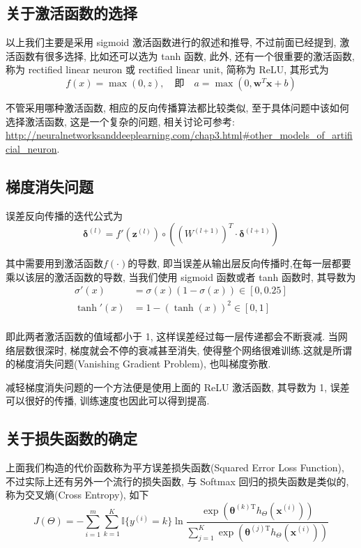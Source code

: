 \documentclass[a4paper,UTF8]{ctexart}
\theoremstyle{plain} \newtheorem{theorem}{定理}[section]
\theoremstyle{plain} \newtheorem{definition}{定义}[section]
\theoremstyle{plain} \newtheorem{lemma}{引理}[section]
\theoremstyle{plain} \newtheorem{proposition}{命题}[section]
\theoremstyle{plain} \newtheorem{example}{例}[section]
\theoremstyle{plain} \newtheorem{remark}{注}[section]
\theoremstyle{plain} \newtheorem{corollary}{推论}[section]
\begin{document}
\subsection{关于激活函数的选择}
以上我们主要是采用 sigmoid 激活函数进行的叙述和推导, 不过前面已经提到, 激活函数有很多选择, 比如还可以选为 tanh 函数, 此外, 还有一个很重要的激活函数, 称为 rectified linear neuron 或 rectified linear unit, 简称为 ReLU, 其形式为
\begin{equation*}
f(x) = \max (0, z), \quad \textrm{即} \quad a = \max(0, \bm{w}^{T} \bm{x} + b)
\end{equation*}

不管采用哪种激活函数, 相应的反向传播算法都比较类似, 至于具体问题中该如何选择激活函数, 这是一个复杂的问题, 相关讨论可参考: \url{http://neuralnetworksanddeeplearning.com/chap3.html#other_models_of_artificial_neuron}.


\subsection{梯度消失问题}
误差反向传播的迭代公式为
\begin{equation*}
\bm{\delta}^{(l)} = f'(\bm{z}^{(l)}) \circ \left( (W^{(l+1)})^{T} \cdot \bm{\delta}^{(l+1)} \right)
\end{equation*}

其中需要用到激活函数$f(\cdot)$的导数, 即当误差从输出层反向传播时,在每一层都要乘以该层的激活函数的导数, 当我们使用 sigmoid 函数或者 tanh 函数时, 其导数为
\begin{align*}
\sigma'(x) & = \sigma(x) (1 - \sigma(x)) \in [0, 0.25] \\ 
\tanh'(x) & = 1 - (\tanh(x))^2 \in [0, 1] \\ 
\end{align*}

即此两者激活函数的值域都小于 1, 这样误差经过每一层传递都会不断衰减. 当网络层数很深时, 梯度就会不停的衰减甚至消失, 使得整个网络很难训练.这就是所谓的梯度消失问题(Vanishing Gradient Problem), 也叫梯度弥散.

减轻梯度消失问题的一个方法便是使用上面的 ReLU 激活函数, 其导数为 1, 误差可以很好的传播, 训练速度也因此可以得到提高.


\subsection{关于损失函数的确定}
上面我们构造的代价函数称为平方误差损失函数(Squared Error Loss Function), 不过实际上还有另外一个流行的损失函数, 与 Softmax 回归的损失函数是类似的, 称为交叉熵(Cross Entropy), 如下
\begin{equation*}
J(\Theta) = - \sum_{i=1}^{m} \sum_{k=1}^{K} \mathbb{I} \{y^{(i)} = k \} \ln \frac{\exp (\bm{\theta}^{(k) \mathrm{T}} h_{\Theta}(\bm{x}^{(i)}))} {\sum_{j=1}^{K} \exp (\bm{\theta}^{(j) \mathrm{T}} h_{\Theta}(\bm{x}^{(i)}))}
\end{equation*}
\end{document}
